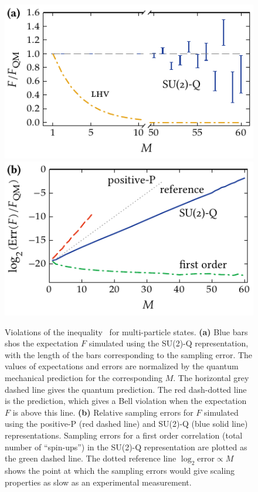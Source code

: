 \begin{figure}
    \centerline{%
    \includegraphics{figures_generated/bell/ghz_violations.pdf}%
    \includegraphics{figures_generated/bell/ghz_errors.pdf}}

    \caption{
    Violations of the inequality~ for multi-particle  states.
    \textbf{(a)} Blue bars shos the expectation $F$ simulated using the SU(2)-Q representation, with the length of the bars corresponding to the sampling error.
    The values of expectations and errors are normalized by the quantum mechanical prediction for the corresponding $M$.
    The horizontal grey dashed line gives the quantum prediction.
    The red dash-dotted line is the  prediction, which gives a Bell violation when the expectation $F$ is above this line.
    \textbf{(b)} Relative sampling errors for $F$ simulated using the positive-P (red dashed line) and SU(2)-Q (blue solid line) representations.
    Sampling errors for a first order correlation (total number of ``spin-ups'') in the SU(2)-Q representation are plotted as the green dashed line.
    The dotted reference line $\log_2 \mathrm{error} \propto M$ shows the point at which the sampling errors would give scaling properties as slow as an experimental measurement.}%

    \label{fig:bell-ineq:ghz:violation}
\end{figure}

